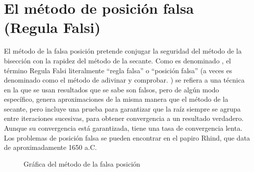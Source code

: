 \section{El método de posición falsa (Regula Falsi)}

El método de la falsa posición pretende conjugar la seguridad del método de la bisección con la rapidez del método de la secante.\newline\newline
Como es denominado \cite{Burden_English}, el término Regula Falsi literalmente “regla falsa” o “posición falsa” (a veces es denominado como el método de adivinar y comprobar. \cite{CS_Web}) se refiera a una técnica en la que se usan resultados que se sabe son falsos, pero de algún modo específico, genera aproximaciones de la misma manera que el método de la secante, pero incluye una prueba para garantizar que la raíz siempre se agrupa entre iteraciones sucesivas, para obtener convergencia a un resultado verdadero. Aunque su convergencia está garantizada, tiene una tasa de convergencia lenta.\newline\newline
Los problemas de posición falsa se pueden encontrar en el papiro Rhind, que data de aproximadamente 1650 a.C.

\begin{figure}[!ht]
    \centering
    \caption{Gráfica del método de la falsa posición}
    \label{regula_grap_ej1}
\end{figure}